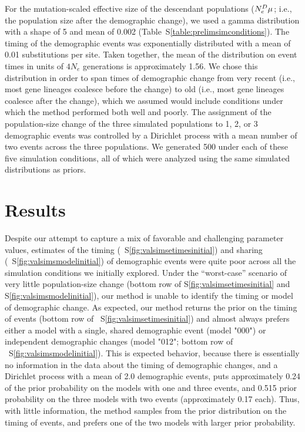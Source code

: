 For the mutation-scaled effective size of the descendant populations
($\epopsize[\descendantpopindex{}]\murate$; i.e., the population size after the
demographic change),
we used a gamma distribution with a shape of 5 and mean of 0.002
(Table~S\ref{table:prelimsimconditions}).
The timing of the demographic events was exponentially distributed with a mean
of 0.01 substitutions per site.
Taken together, the mean of the distribution on event times in units of $4N_e$
generations is approximately 1.56.
We chose this distribution in order to span times of demographic change from
very recent (i.e., most gene lineages coalesce before the change) to old (i.e.,
most gene lineages coalesce after the change),
which we assumed would include conditions under which the method performed both
well and poorly.
The assignment of the population-size change of the three simulated populations
to 1, 2, or 3 demographic events was controlled by a Dirichlet process with a
mean number of two events across the three populations.
We generated 500 \datasets under each of these five simulation conditions, all
of which were analyzed using the same simulated distributions as priors.

\section{Results}
Despite our attempt to capture a mix of favorable and challenging parameter
values,
estimates of the timing
(\fig{}~S\ref{fig:valsimsetimesinitial})
and sharing
(\fig{}~S\ref{fig:valsimsmodelinitial})
of demographic events were quite poor across all the simulation conditions
we initially explored.
Under the ``worst-case'' scenario of very little population-size change
(bottom row of \figs S\ref{fig:valsimsetimesinitial} and
S\ref{fig:valsimsmodelinitial}),
our method is unable to identify the timing or model of demographic change.
As expected, our method returns the prior on the timing of events
(bottom row of \fig{}~S\ref{fig:valsimsetimesinitial})
and almost always prefers either a model with a single, shared demographic
event (model "000") or independent demographic changes (model "012";
bottom row of \fig{}~S\ref{fig:valsimsmodelinitial}).
This is expected behavior, because there is essentially no information in the
data about the timing of demographic changes, and a Dirichlet process with a
mean of 2.0 demographic events, puts approximately 0.24 of the prior
probability on the models with one and three events, and 0.515 prior
probability on the three models with two events (approximately 0.17 each).
Thus, with little information, the method samples from the prior distribution
on the timing of events, and prefers one of the two models with larger prior
probability.

